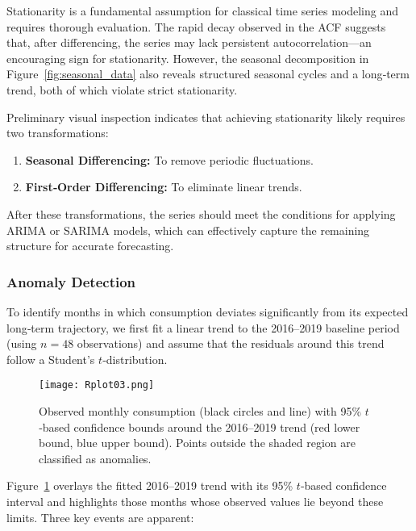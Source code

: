 \documentclass[10pt]{article}
\begin{document}
Stationarity is a fundamental assumption for classical time series modeling and requires thorough evaluation. The rapid decay observed in the ACF suggests that, after differencing, the series may lack persistent autocorrelation—an encouraging sign for stationarity. However, the seasonal decomposition in Figure~\ref{fig:seasonal_data} also reveals structured seasonal cycles and a long‑term trend, both of which violate strict stationarity.

Preliminary visual inspection indicates that achieving stationarity likely requires two transformations:
\begin{enumerate}
  \item \textbf{Seasonal Differencing:} To remove periodic fluctuations.
  \item \textbf{First‑Order Differencing:} To eliminate linear trends.
\end{enumerate}

After these transformations, the series should meet the conditions for applying ARIMA or SARIMA models, which can effectively capture the remaining structure for accurate forecasting.



\subsubsection{Anomaly Detection}

To identify months in which consumption deviates significantly from its expected long‐term trajectory, we first fit a linear trend to the 2016–2019 baseline period (using $n=48$ observations) and assume that the residuals around this trend follow a Student’s $t$‐distribution. 

\begin{figure}[ht]
\centering
\texttt{[image: Rplot03.png]}
\caption{Observed monthly consumption (black circles and line) with 95\% $t$‐based confidence bounds around the 2016–2019 trend (red lower bound, blue upper bound).  Points outside the shaded region are classified as anomalies.}
\label{fig:anomaly_detection}
\end{figure}

Figure~\ref{fig:anomaly_detection} overlays the fitted 2016–2019 trend with its 95\% $t$‐based confidence interval and highlights those months whose observed values lie beyond these limits.  Three key events are apparent:
\end{document}
